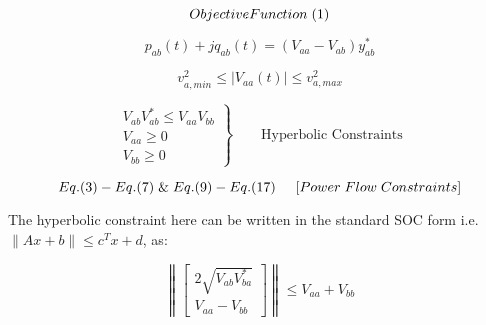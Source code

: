\begin{tcolorbox}[colback=gray!5!white,colframe=gray!25!black,title=Feasible Set 6 (Second Order Cone Power Flow):]
\[
Objective Function\hspace{0.1cm}(1)
\]

\[
  p_{ab}(t) + jq_{ab}(t)= \left ( V_{aa} - V_{ab} \right )y_{ab}^\ast
\]

\[
  v_{a,min}^2\leq \left |V_{aa}(t) \right | \leq v_{a,max}^2  
\]

\[
 \left.\begin{aligned}
    V_{ab}V_{ab}^\ast \leq V_{aa}V_{bb} \\
    V_{aa}\geq 0 \\
    V_{bb}\geq 0
       \end{aligned}
 \right\}
 \qquad \text{Hyperbolic Constraints}
\]

\[
Eq.(3) - Eq.(7)\hspace{0.1cm} \&\hspace{0.1cm} Eq.(9) - Eq.(17) \hspace{0.5cm} [Power \hspace{0.1cm} Flow \hspace{0.1cm}  Constraints] 
\]

\end{tcolorbox}

The hyperbolic constraint here can be written in the standard SOC form i.e. $\lVert Ax+b \rVert \leq c^Tx+d$, as: 

\[
   \left \|  \begin{bmatrix}
        2\sqrt{V_{ab}V_{ba}^\ast} \\
        V_{aa}-V_{bb} 
            \end{bmatrix} 
    \right \| 
    \leq V_{aa}+V_{bb}
\]